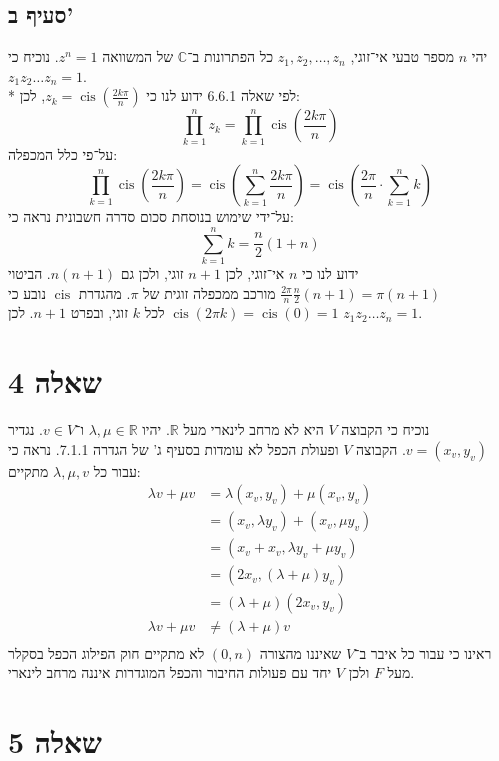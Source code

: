 \documentclass[a4paper,10pt]{article}
\DeclareMathOperator\cis{cis}
\def\RR{\mathbb{R}}
\def\CC{\mathbb{C}}
\begin{document}
	\subsection{סעיף ב'}
	יהי $n$ מספר טבעי אי־זוגי,
	$z_1, z_2, \ldots, z_n$ כל הפתרונות ב־$\CC$ של המשוואה $z^n = 1$.
	נוכיח כי $z_1 z_2 \ldots z_n = 1$. \\*
	לפי שאלה 6.6.1 ידוע לנו כי $z_k = \cis(\frac{2k \pi}{n})$, לכן:
	\[
		\prod_{k = 1}^n z_k =
		\prod_{k = 1}^n \cis(\frac{2k \pi}{n})
	\]
	על־פי כלל המכפלה:
	\[
		\prod_{k = 1}^n \cis(\frac{2k \pi}{n}) =
		\cis(\sum_{k = 1}^n \frac{2k \pi}{n}) = 
		\cis(\frac{2 \pi}{n} \cdot \sum_{k = 1}^n {k})
	\]
	על־ידי שימוש בנוסחת סכום סדרה חשבונית נראה כי:
	\[
		\sum_{k = 1}^n {k} = \frac{n}{2} (1 + n)
	\]
	ידוע לנו כי $n$ אי־זוגי, לכן $n + 1$ זוגי, ולכן גם $n(n + 1)$.
	הביטוי $\frac{2 \pi}{n} \frac{n}{2}(n + 1) = \pi (n + 1)$
	מורכב ממכפלה זוגית של $\pi$.
	מהגדרת $\cis$ נובע כי $\cis(2 \pi k) = \cis(0) = 1$ לכל $k$ זוגי,
	ובפרט $n + 1$. לכן $z_1 z_2 \ldots z_n = 1$.

	\section{שאלה 4}
	נוכיח כי הקבוצה $V$ היא לא מרחב לינארי מעל $\RR$.
	יהיו $\lambda, \mu \in \RR$ ו־$v \in V$.
	נגדיר $v = (x_v, y_v)$.
	הקבוצה $V$ ופעולת הכפל לא עומדות בסעיף ג' של הגדרה 7.1.1.
	נראה כי עבור כל $\lambda, \mu, v$ מתקיים:
	\begin{align*}
		\lambda v + \mu v
		& = \lambda (x_v, y_v) + \mu (x_v, y_v) \\
		& = (x_v, \lambda y_v) + (x_v, \mu y_v) \\
		& = (x_v + x_v, \lambda y_v + \mu y_v) \\
		& = (2 x_v, (\lambda + \mu) y_v) \\
		& = (\lambda + \mu) (2 x_v, y_v) \\
		\lambda v + \mu v
		& \ne (\lambda + \mu) v \\
	\end{align*}
	ראינו כי עבור כל איבר ב־$V$ שאיננו מהצורה $(0, n)$ לא מתקיים חוק הפילוג הכפל בסקלר מעל $F$ ולכן $V$ יחד עם פעולות החיבור והכפל המוגדרות איננה מרחב לינארי.

	\section{שאלה 5}
\end{document}
